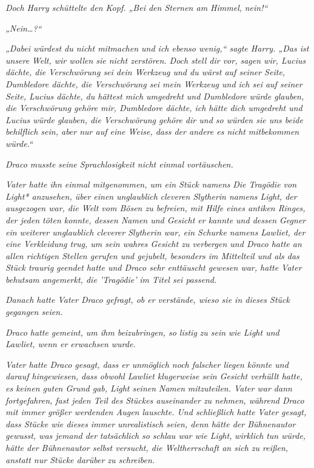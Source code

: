 {\emph{Doch Harry schüttelte den Kopf. „Bei den Sternen am Himmel,} \emph{\emph{nein!}“}

\emph{„Nein…?“}

\emph{„Dabei würdest du nicht mitmachen und ich ebenso wenig,“ sagte Harry. „Das ist} \emph{\emph{unsere}} \emph{Welt, wir wollen sie nicht zerstören. Doch stell dir vor, sagen wir, Lucius dächte, die Verschwörung sei dein Werkzeug und du wärst auf seiner Seite, Dumbledore dächte, die Verschwörung sei mein Werkzeug und ich sei auf seiner Seite, Lucius dächte, du hättest mich umgedreht und Dumbledore würde glauben, die Verschwörung gehöre mir, Dumbledore dächte, ich hätte dich umgedreht und Lucius würde glauben, die Verschwörung gehöre dir und so würden sie uns beide behilflich sein, aber nur auf eine Weise, dass der andere es nicht mitbekommen würde.“}

\emph{Draco musste} \emph{seine Sprachlosigkeit nicht einmal vortäuschen.}

\emph{Vater hatte ihn einmal mitgenommen, um ein Stück namens} \emph{\emph{Die Tragödie von Light}* anzusehen, über einen} \emph{\emph{unglaublich}} \emph{cleveren Slytherin namens Light, der ausgezogen war, die Welt vom Bösen zu befreien, mit Hilfe eines antiken Ringes, der jeden töten konnte, dessen Namen und Gesicht er kannte und dessen Gegner ein weiterer unglaublich cleverer Slytherin war, ein Schurke namens Lawliet, der eine Verkleidung trug, um sein wahres Gesicht zu verbergen und Draco hatte an allen richtigen Stellen gerufen und gejubelt, besonders im Mittelteil und als das Stück traurig geendet hatte und Draco sehr enttäuscht gewesen war, hatte Vater} \emph{behutsam angemerkt, die 'Tragödie'} \emph{im Titel sei passend.}

\emph{Danach hatte Vater Draco gefragt, ob er verstände, wieso sie in dieses Stück gegangen seien.}

\emph{Draco hatte gemeint, um ihm beizubringen, so listig} \emph{zu sein} \emph{wie Light und Lawliet, wenn er erwachsen wurde.}

\emph{Vater hatte Draco gesagt, dass er unmöglich noch falscher liegen könnte und} \emph{darauf hingewiesen, dass obwohl Lawliet klugerweise sein Gesicht verhüllt hatte, es keinen guten Grund gab, Light seinen} \emph{\emph{Namen}} \emph{mitzuteilen. Vater war dann fortgefahren, fast jeden Teil des Stückes auseinander zu nehmen, während Draco mit immer größer werdenden Augen lauschte. Und schließlich hatte Vater gesagt, dass Stücke wie dieses} \emph{\emph{immer}} \emph{unrealistisch seien, denn hätte der Bühnenautor gewusst, was jemand der} \emph{\emph{tatsächlich}} \emph{so schlau war wie Light,} \emph{\emph{wirklich}} \emph{tun würde, hätte der Bühnenautor selbst versucht, die Weltherrschaft an sich zu reißen, anstatt nur Stücke darüber zu schreiben.}

}
